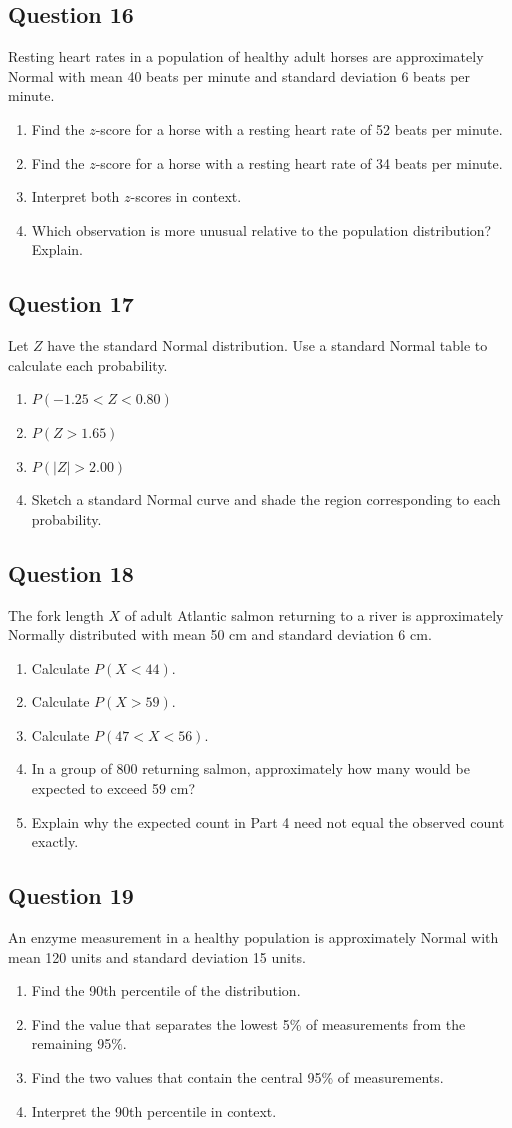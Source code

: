 \documentclass[10pt,letterpaper]{article}
\newcommand{\questionheading}[1]{%
  \subsection*{Question #1}
}
\begin{document}
\newpage

\questionheading{16}
Resting heart rates in a population of healthy adult horses are approximately Normal with mean 40 beats per minute and standard deviation 6 beats per minute.
\begin{enumerate}
\item Find the $z$-score for a horse with a resting heart rate of 52 beats per minute.
\item Find the $z$-score for a horse with a resting heart rate of 34 beats per minute.
\item Interpret both $z$-scores in context.
\item Which observation is more unusual relative to the population distribution? Explain.
\end{enumerate}

\questionheading{17}
Let $Z$ have the standard Normal distribution. Use a standard Normal table to calculate each probability.
\begin{enumerate}
\item $P(-1.25<Z<0.80)$
\item $P(Z>1.65)$
\item $P(|Z|>2.00)$
\item Sketch a standard Normal curve and shade the region corresponding to each probability.
\end{enumerate}

\questionheading{18}
The fork length $X$ of adult Atlantic salmon returning to a river is approximately Normally distributed with mean 50 cm and standard deviation 6 cm.
\begin{enumerate}
\item Calculate $P(X<44)$.
\item Calculate $P(X>59)$.
\item Calculate $P(47<X<56)$.
\item In a group of 800 returning salmon, approximately how many would be expected to exceed 59 cm?
\item Explain why the expected count in Part 4 need not equal the observed count exactly.
\end{enumerate}

\questionheading{19}
An enzyme measurement in a healthy population is approximately Normal with mean 120 units and standard deviation 15 units.
\begin{enumerate}
\item Find the 90th percentile of the distribution.
\item Find the value that separates the lowest 5\% of measurements from the remaining 95\%.
\item Find the two values that contain the central 95\% of measurements.
\item Interpret the 90th percentile in context.
\end{enumerate}
\end{document}
